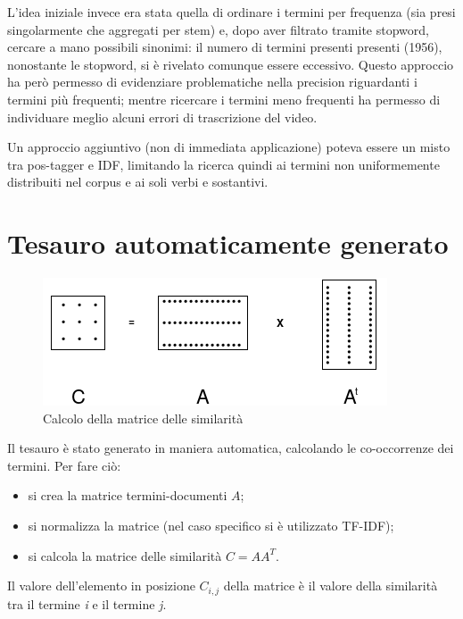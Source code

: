 L'idea iniziale invece era stata quella di ordinare i termini per frequenza (sia presi singolarmente che aggregati per stem) e, dopo aver filtrato tramite stopword, cercare a mano possibili sinonimi: il numero di termini presenti presenti (1956), nonostante le stopword, si è rivelato comunque essere eccessivo. Questo approccio ha però permesso di evidenziare problematiche nella precision riguardanti i termini più frequenti; mentre ricercare i termini meno frequenti ha permesso di individuare meglio alcuni errori di trascrizione del video.

Un approccio aggiuntivo (non di immediata applicazione) poteva essere un misto tra \gls{pos-tagger} e IDF, limitando la ricerca quindi ai termini non uniformemente distribuiti nel \gls{corpus} e ai soli verbi e sostantivi.

\section{Tesauro automaticamente generato}
\label{sec:comeGenerareTesauroAuto}

    \begin{figure}
        \centering
        \includegraphics[scale=0.55]{immagini/calcoloSimilarita.png}
        \caption{Calcolo della matrice delle similarità}
        \label{fig:calcoloSimilarità}
     \end{figure}    

Il tesauro è stato generato in maniera automatica, calcolando le co-occorrenze dei termini.
Per fare ciò:
\begin{itemize}
    \item si crea la matrice termini-documenti $A$;
    \item si normalizza la matrice (nel caso specifico si è utilizzato TF-IDF);
    \item si calcola la matrice delle similarità $C = AA^{T}$.
\end{itemize}

Il valore dell'elemento in posizione $C_{i,j}$ della matrice è il valore della similarità tra il termine \textit{i} e il termine \textit{j}.

